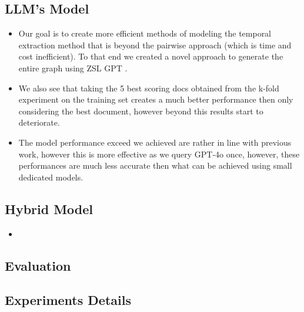 \subsection{LLM's Model}
\begin{itemize}
    \item Our goal is to create more efficient methods of modeling the temporal extraction method that is beyond the pairwise approach (which is time and cost inefficient). To that end we created a novel approach to generate the entire graph using ZSL GPT . 
    \item We also see that taking the 5 best scoring docs obtained from the k-fold experiment on the training set creates a much better performance then only considering the best document, however beyond this results start to deteriorate. 
    \item The model performance exceed  we achieved are rather in line with previous work, however this is more effective as we query GPT-4o once, however, these performances are much less accurate then what can be achieved using small dedicated models.
\end{itemize}

\subsection{Hybrid Model}
\begin{itemize}
    \item 
\end{itemize}

\subsection{Evaluation}

\subsection{Experiments Details}
